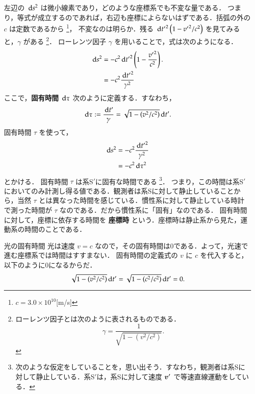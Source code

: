     左辺の $\,\mathrm{d} s^{2}$ は微小線素であり，どのような座標系でも不変な量である．
    つまり，等式が成立するのであれば，右辺も座標によらないはずである．括弧の外の $c$ は定数であるから
        \footnote{
            $c = 3.0 \times 10^{10}$[m/s]
        }，
    不変なのは明らか．残る $\,\mathrm{d} {t'}^{2}\left(1-{v'}^{2}/c^{2}\right)$ を見てみると，$\gamma$ がある
        \footnote{
            ローレンツ因子とは次のように表されるものである．
                \begin{equation*}
                    \gamma = \frac{1}{\sqrt{1-\left(v^{2}/c^{2}\right)}}.
                \end{equation*}
        }．
    ローレンツ因子 $\gamma$ を用いることで，式は次のようになる．
        \begin{align*}
            \,\mathrm{d} s^{2} &= -c^{2}{\,\mathrm{d} t'}^{2}\left( 1 - \frac{{v'}^{2}}{c^{2}} \right). \\
                      &= -c^{2}\frac{{\,\mathrm{d} t'}^{2}}{{\gamma}^{2}}
        \end{align*}
    ここで，\textbf{固有時間} $\,\mathrm{d} \tau$ 次のように定義する．すなわち，
        \begin{align}
            \,\mathrm{d} \tau := \frac{\,\mathrm{d} t'}{\gamma}
                 =      \sqrt{1-\left(v^{2}/c^{2}\right)}\,\mathrm{d} t'.
        \end{align}
    固有時間 $\tau$ を使って，
        \begin{align*}
            \,\mathrm{d} s^{2} &= -c^{2}\frac{{\,\mathrm{d} t'}^{2}}{{\gamma}^{2}} \\
                      &= -c^{2} \,\mathrm{d} \tau^{2}
        \end{align*}
    とかける．
    固有時間 $\tau$ は系S$'$に固有な時間である
        \footnote{
            次のような仮定をしていることを，思い出そう．すなわち，観測者は系Sに対して静止している．系S$'$は，系Sに対して速度 $\boldsymbol{v} '$ で等速直線運動をしている．
        }．
    つまり，この時間は系S$'$においてのみ計測し得る値である．観測者は系Sに対して静止していることから，当然 $\tau$ とは異なった時間を感じている．慣性系に対して静止している時計で測った時間が $\tau$ なのである．だから慣性系に「固有」なのである．
    固有時間に対して，座標に依存する時間を \textbf{座標時} という．座標時は静止系から見た，運動系の時間のことである．
    \begin{memo}{光の固有時間}
        光は速度 $v=c$ なので，その固有時間は0である．よって，光速で進む座標系では時間はすすまない．
        固有時間の定義式の $v$ に $c$ を代入すると，以下のように0になるからだ．
            \[
                \sqrt{1-\left(v^{2}/c^{2}\right)}\,\mathrm{d} t' = \sqrt{1-\left(c^{2}/c^{2}\right)}\,\mathrm{d} t' = 0.
            \]
    \end{memo}

